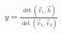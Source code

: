\documentclass[preview]{standalone}
\begin{document}
\begin{align*}
y = \frac{\det(\vec{v}_1, \vec{b})}{\det(\vec{v}_1, \vec{v}_2)}
\end{align*}
\end{document}
